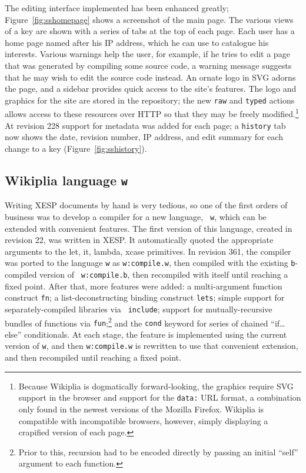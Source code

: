 \documentclass[twocolumn]{article}
\begin{document}
The editing interface implemented has been enhanced greatly;
Figure~\ref{fig:sshomepage} shows a screenshot of the main page. The
various views of a key are shown with a series of tabs at the top of
each page. Each user has a home page named after his IP
address,\z{} which he can use to catalogue his
interests. Various warnings help the user, for example, if he tries to
edit a page that was generated by compiling some source code, a
warning message suggests that he may wish to edit the source code
instead. An ornate logo in SVG adorns
the page, and a sidebar provides quick access to the site's features.
The logo and graphics for the site are stored in the repository; the
new {\tt raw} and {\tt typed} actions allows access to these resources
over HTTP so that they may be freely modified.\z\footnote{Because
Wikiplia is dogmatically forward-looking, the graphics require SVG
support in the browser and support for the {\tt data:} URL format, a
combination only found in the newest versions of the Mozilla Firefox.
Wikiplia is compatible with incompatible browsers, however, simply
displaying a crapified version of each page.} At revision 228 support
for metadata was added for each page; a {\tt history} tab now shows
the date, revision number, IP address, and edit summary for each
change to a key (Figure~\ref{fig:sshistory}).

\subsection{Wikiplia language {\tt w}}

Writing XESP documents by hand is very tedious, so one of the first
orders of business was to develop a compiler for a new language, {\tt
w}, which can be extended with convenient features. The first version
of this language, created in revision 22, was written in XESP. It
automatically quoted the appropriate arguments to the {\sf let}, {\sf
it}, {\sf lambda}, {\sf xcase} primitives. In revision 361, the
compiler was ported to the language {\tt w} as {\tt w:compile.w}, then
compiled with the existing {\tt b}-compiled version of {\tt
w:compile.b}, then recompiled with itself until reaching a fixed
point.\z{} After that, more features
were added: a multi-argument function construct {\tt fn}; a
list-deconstructing binding construct {\tt lets}; simple support for
separately-compiled libraries via {\tt
include}; support for mutually-recursive bundles of functions via {\tt fun};\footnote{Prior to
this, recursion had to be encoded directly by passing an initial
``self'' argument to each function.} and the {\tt cond} keyword for
series of chained ``if\ldots else'' conditionals. At each stage, the
feature is implemented using the current version of {\tt w}, and then
{\tt w:compile.w} is rewritten to use that convenient extension, and
then recompiled until reaching a fixed point.
\end{document}
